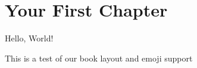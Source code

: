 \documentclass[12pt,openany]{book}
\begin{document}
\frontmatter
\tableofcontents

\mainmatter
\chapter{Your First Chapter}

Hello, World! 

This is a test of our book layout and emoji support 


\end{document}
